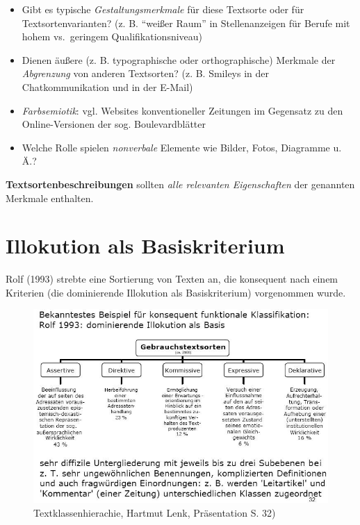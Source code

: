 \documentclass[
  letterpaper,
]{scrbook}
\providecommand{\tightlist}{%
  \setlength{\itemsep}{0pt}\setlength{\parskip}{0pt}}\usepackage{longtable,booktabs,array}
\begin{document}
\begin{itemize}
\tightlist
\item
  Gibt es typische \emph{Gestaltungsmerkmale} für diese Textsorte oder
  für Textsortenvarianten? (z. B. ``weißer Raum'' in Stellenanzeigen für
  Berufe mit hohem vs.~geringem Qualifikationsniveau)\\
\item
  Dienen äußere (z. B. typographische oder orthographische) Merkmale der
  \emph{Abgrenzung} von anderen Textsorten? (z. B. Smileys in der
  Chatkommunikation und in der E-Mail)\\
\item
  \emph{Farbsemiotik}: vgl. Websites konventioneller Zeitungen im
  Gegensatz zu den Online-Versionen der sog. Boulevardblätter\\
\item
  Welche Rolle spielen \emph{nonverbale} Elemente wie Bilder, Fotos,
  Diagramme u. Ä.?\\
\end{itemize}

\textbf{Textsortenbeschreibungen} sollten \emph{alle relevanten
Eigenschaften} der genannten Merkmale enthalten.

\hypertarget{illokution-als-basiskriterium}{%
\section{Illokution als
Basiskriterium}\label{illokution-als-basiskriterium}}

Rolf (1993) strebte eine Sortierung von Texten an, die konsequent nach
einem Kriterien (die dominierende Illokution als Basiskriterium)
vorgenommen wurde.

\begin{figure}

{\centering \includegraphics[width=1\textwidth,height=\textheight]{./pictures/Funktionale_Klassifizierung_Rolf1993.jpg}

}

\caption{Textklassenhierachie, Hartmut Lenk, Präsentation S. 32)}

\end{figure}
\end{document}
